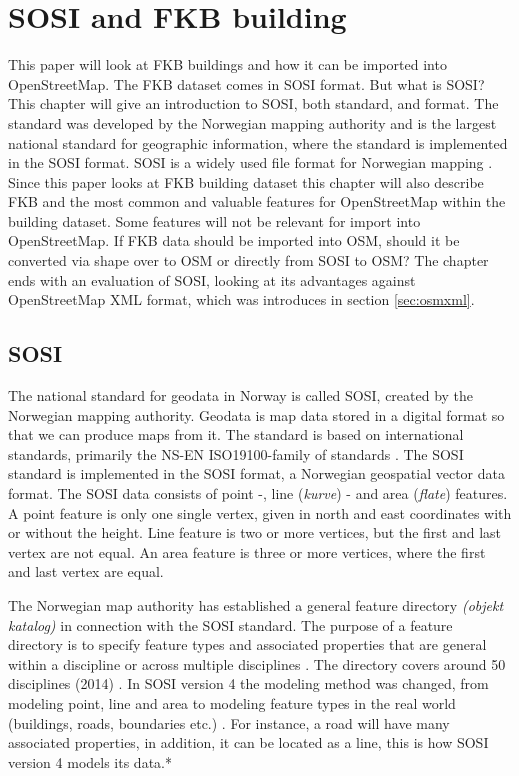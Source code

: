\chapter{SOSI and FKB building}
This paper will look at FKB buildings and how it can be imported into OpenStreetMap. The FKB dataset comes in SOSI format. But what is SOSI? This chapter will give an introduction to SOSI, both standard, and format. The standard was developed by the Norwegian mapping authority and is the largest national standard for geographic information, where the standard is implemented in the SOSI format. SOSI is a widely used file format for Norwegian mapping \cite{Kartverketa}. Since this paper looks at FKB building dataset this chapter will also describe FKB and the most common and valuable features for OpenStreetMap within the building dataset. Some features will not be relevant for import into OpenStreetMap. If FKB data should be imported into OSM, should it be converted via shape over to OSM or directly from SOSI to OSM? The chapter ends with an evaluation of SOSI, looking at its advantages against OpenStreetMap XML format, which was introduces in section \ref{sec:osmxml}.  

\section{SOSI}
The national standard for geodata in Norway is called SOSI, created by the Norwegian mapping authority. Geodata is map data stored in a digital format so that we can produce maps from it. The standard is based on international standards, primarily the NS-EN ISO19100-family of standards \cite{Skogseth2014}. The SOSI standard is implemented in the SOSI format, a Norwegian geospatial vector data format. The SOSI data consists of point -, line (\textit{kurve}) - and area (\textit{flate}) features. A point feature is only one single vertex, given in north and east coordinates with or without the height. Line feature is two or more vertices, but the first and last vertex are not equal. An area feature is three or more vertices, where the first and last vertex are equal. 

The Norwegian map authority has established a general feature directory \textit{(objekt katalog)} in connection with the SOSI standard. The purpose of a feature directory is to specify feature types and associated properties that are general within a discipline or across multiple disciplines \cite{Kartverket2016}.  The directory covers around 50 disciplines (2014) \cite{Skogseth2014}.  In SOSI version 4 the modeling method was changed, from modeling point, line and area to modeling feature types in the real world (buildings, roads, boundaries etc.) \cite{Skogseth2014}. For instance, a road will have many associated properties, in addition, it can be located as a line, this is how SOSI version 4 models its data.* %

